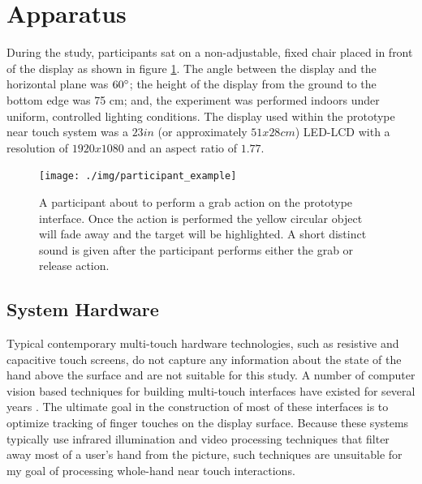 \section{Apparatus}
During the study, participants sat on a non-adjustable, fixed chair placed in front of the display as shown in figure \ref{fig:participant_example}.
The angle between the display and the horizontal plane was $60\degree$; the height of the display from the ground to the bottom edge was 75 cm; and, 
the experiment was performed indoors under uniform, controlled lighting conditions.
The display used within the prototype near touch system was a $23in$ (or approximately $51x28 cm$) LED-LCD with a resolution of $1920x1080$ and an aspect ratio of $1.77$.

\begin{figure}[h]
 \centering
 \texttt{[image: ./img/participant\_example]}
 \caption[A participant about to perform a grab action on the prototype interface]{
A participant about to perform a grab action on the prototype interface. 
Once the action is performed the yellow circular object will fade away and the target will be highlighted.
A short distinct sound is given after the participant performs either the grab or release action. 
}
 \label{fig:participant_example}
\end{figure}

\subsection{System Hardware}
Typical contemporary multi-touch hardware technologies, such as resistive and capacitive touch screens, do not capture any information about the state of the hand above the surface and are not suitable for this study.
A number of computer vision based techniques for building multi-touch interfaces have existed for several years \cite{Han:2005:LCMTSTFTIR}.
The ultimate goal in the construction of most of these interfaces is to optimize tracking of finger touches on the display surface.  Because these systems typically use infrared illumination and video processing techniques that filter away most of a user's hand from the picture, such techniques are unsuitable for my goal of processing whole-hand near touch interactions. 

